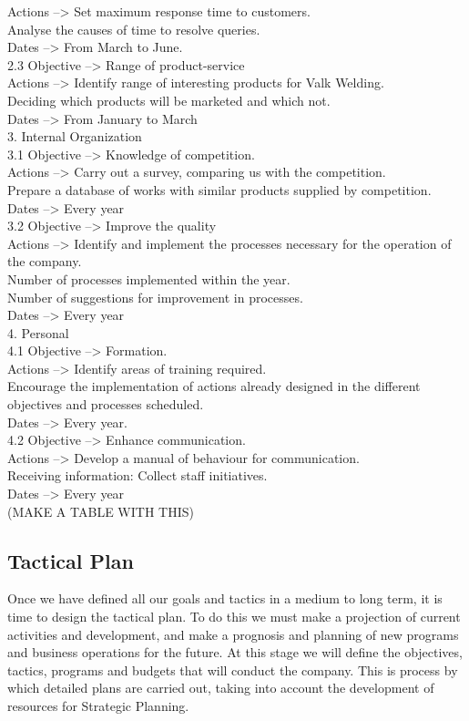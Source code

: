 	Actions --> Set maximum response time to customers.\\
				Analyse the causes of time to resolve queries.\\
	Dates --> From March to June.\\
2.3 Objective --> Range of product-service\\
	Actions --> Identify range of interesting products for Valk Welding.\\
				Deciding which products will be marketed and which not.\\
	Dates --> From January to March\\
3. Internal Organization\\
3.1 Objective --> Knowledge of competition.\\
	Actions --> Carry out a survey, comparing us with the competition.\\
				Prepare a database of works with similar products supplied by competition.\\
	Dates --> Every year\\
3.2 Objective --> Improve the quality\\
	Actions --> Identify and implement the processes necessary for the operation of the company.\\
				Number of processes implemented within the year.\\
				Number of suggestions for improvement in processes.\\
	Dates --> Every year\\
4. Personal\\
4.1 Objective --> Formation.\\
	Actions --> Identify areas of training required.\\
				Encourage the implementation of actions already designed in the different objectives and processes scheduled.\\
	Dates --> Every year.\\
4.2 Objective --> Enhance communication.\\
	Actions --> Develop a manual of behaviour for communication.\\
				Receiving information: Collect staff initiatives.\\
	Dates --> Every year\\

(MAKE A TABLE WITH THIS)

\subsection{Tactical Plan}
Once we have defined all our goals and tactics in a medium to long term, it is time to design the tactical plan. To do this we must make a projection of current activities and development, and make a prognosis and planning of new programs and business operations for the future. At this stage we will define the objectives, tactics, programs and budgets that will conduct the company. This is process by which detailed plans are carried out, taking into account the development of resources for Strategic Planning.

